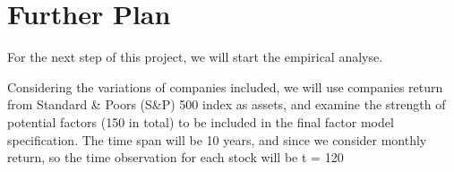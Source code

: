 \documentclass[12pt]{article}
\begin{document}
			\section{Further Plan}
For the next step of this project, we will start the empirical analyse. 

Considering the variations of companies included, we will use companies return from Standard \& Poors (S\&P) 500 index as assets, and examine the strength of potential factors (150 in total) to be included in the final factor model specification. 
The time span will be 10 years, and since we consider monthly return, so the time observation for each stock will be t = 120



\newpage



\newpage
\appendix


\end{document}
